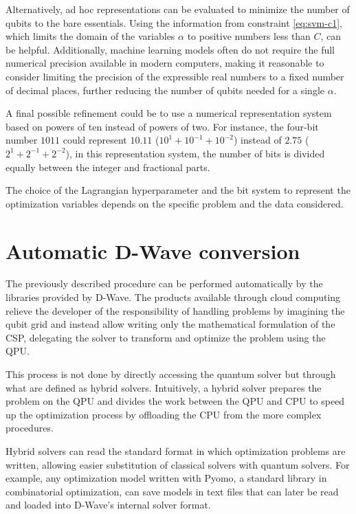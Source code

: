 Alternatively, ad hoc representations can be evaluated to minimize the number of qubits to the bare essentials. Using the information from constraint \ref{eq:svm-c1}, which limits the domain of the variables $\alpha$ to positive numbers less than $C$, can be helpful. Additionally, machine learning models often do not require the full numerical precision available in modern computers, making it reasonable to consider limiting the precision of the expressible real numbers to a fixed number of decimal places, further reducing the number of qubits needed for a single $\alpha$.

A final possible refinement could be to use a numerical representation system based on powers of ten instead of powers of two. For instance, the four-bit number $1011$ could represent $10.11$ ($10^1 + 10^{-1} + 10^{-2}$) instead of $2.75$ ($2^1 + 2^{-1} + 2^{-2}$), in this representation system, the number of bits is divided equally between the integer and fractional parts.

The choice of the Lagrangian hyperparameter and the bit system to represent the optimization variables depends on the specific problem and the data considered.

\section{Automatic D-Wave conversion}

The previously described procedure can be performed automatically by the libraries provided by D-Wave. The products available through cloud computing relieve the developer of the responsibility of handling problems by imagining the qubit grid and instead allow writing only the mathematical formulation of the CSP, delegating the solver to transform and optimize the problem using the QPU.

This process is not done by directly accessing the quantum solver but through what are defined as hybrid solvers\cite{hybrid}. Intuitively, a hybrid solver prepares the problem on the QPU and divides the work between the QPU and CPU to speed up the optimization process by offloading the CPU from the more complex procedures.

Hybrid solvers can read the standard format in which optimization problems are written, allowing easier substitution of classical solvers with quantum solvers. For example, any optimization model written with Pyomo\cite{pyomo}, a standard library in combinatorial optimization, can save models in text files that can later be read and loaded into D-Wave’s internal solver format.

